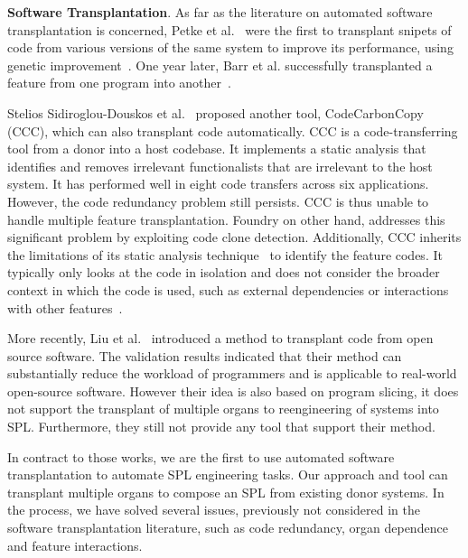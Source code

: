 \textbf{Software Transplantation}. As far as the literature on automated software transplantation is concerned, Petke et al.~\cite{Petke2014,Petke2018} were the first to transplant snipets of code from various versions of the same system to improve its performance, using genetic improvement~\cite{Petke18}. One year later, Barr et al. successfully transplanted a feature from one program into another~\cite{Barr2015}. 

Stelios Sidiroglou-Douskos et al.~\cite{Sidiroglou2017} proposed another tool, CodeCarbonCopy (CCC), which can also transplant code automatically. CCC is a code-transferring tool from a donor into a host codebase. It implements a static analysis that identifies and removes irrelevant functionalists that are irrelevant to the host system. It has performed well in eight code transfers across six applications. However, the code redundancy problem still persists.  CCC is thus unable to handle multiple feature transplantation. Foundry on other hand, addresses this significant problem by exploiting code clone detection. Additionally, CCC inherits the limitations of its static analysis technique~\cite{Bessey2010} to identify the feature codes. It typically only looks at the code in isolation and does not consider the broader context in which the code is used, such as external dependencies or interactions with other features~\cite{Bessey2010, Ilyas2016}.

More recently, Liu et al.~\cite{Liu2018} introduced a method to transplant code from open source software. The validation results indicated that their method can substantially reduce the workload of programmers and is applicable to real-world open-source software. However their idea is also based on program slicing, it does not support the transplant of multiple organs to reengineering of systems into SPL. Furthermore, they still not provide any tool that support their method.

In contract to those works, we are the first to use automated software transplantation to automate SPL engineering tasks. Our approach and tool can transplant multiple organs to compose an SPL from existing donor systems. In the process, we have solved several issues, previously not considered in the software transplantation literature, such as code redundancy, organ dependence and feature interactions.



